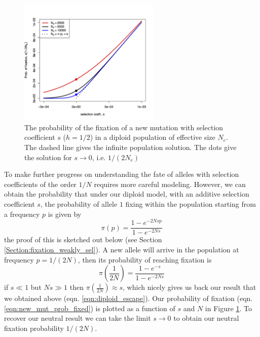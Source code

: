 \begin{figure}
\begin{center}
\includegraphics[width=0.6\textwidth]{figures/prob_fix_diffusion.png}
\end{center}
\caption{The probability of the fixation of a new mutation with
  selection coefficient $s$ ($h=1/2$) in a diploid population of effective
  size $N_e$. The dashed line gives the infinite population
  solution. The dots give the solution for $s \rightarrow 0$, i.e. $1/(2N_e)$} \label{fig:prob_fix_diffusion}
\end{figure}

To make further progress on understanding the fate of alleles with
selection coefficients of the order $1/N$ requires more careful
modeling. However, we can obtain the probability that under our diploid model, with an additive selection coefficient $s$, the
probability of allele $1$ fixing within the population starting
from a frequency $p$ is given by
\begin{equation}
\pi(p) = \frac{1-e^{-2Ns p }}{1-e^{-2Ns}} \label{eqn:prob_fixed}
\end{equation}
the proof of this is sketched out below (see Section \ref{Section:fixation_weakly_sel}). A new allele will arrive in the population at frequency $p=1/(2N)$,
then its probability of reaching fixation is
\begin{equation}
\pi \left(\frac{1}{2N} \right) = \frac{1-e^{-s }}{1-e^{-2Ns}} \label{eqn:new_mut_prob_fixed}
\end{equation}
if $s \ll1$ but $Ns \gg 1$ then $\pi(\frac{1}{2N}) \approx s$, which
nicely gives
us back our result that we obtained above
(eqn. \eqref{eqn:diploid_escape}). Our probability of fixation
(eqn. \eqref{eqn:new_mut_prob_fixed}) is plotted as a function of $s$
and $N$ in Figure \ref{fig:prob_fix_diffusion}. To recover our neutral
result we can take the
limit $s \rightarrow 0$ to obtain our neutral fixation
probability $1/(2N)$. \\

